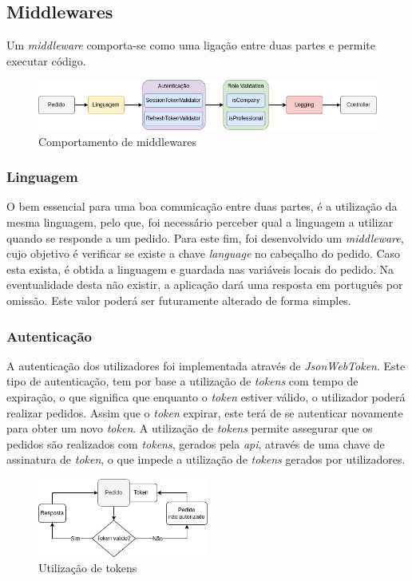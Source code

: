 \subsection{Middlewares} 
Um \textit{middleware} comporta-se como uma ligação entre duas partes e permite executar código.

\begin{figure}[htb]
 \centering
 \includegraphics[width=\textwidth]{images/implementacao/api/middlewares.png}
 \caption{Comportamento de middlewares}
 \label{middlewares_png}
\end{figure}

\subsubsection{Linguagem}
O bem essencial para uma boa comunicação entre duas partes, é a utilização da mesma linguagem, pelo que, foi necessário perceber qual a linguagem a utilizar quando se responde a um pedido. Para este fim, foi desenvolvido um \textit{middleware}, cujo objetivo é verificar se existe a chave \textit{language} no cabeçalho do pedido. Caso esta exista, é obtida a linguagem e guardada nas variáveis locais do pedido. Na eventualidade desta não existir, a aplicação dará uma resposta em português por omissão. Este valor poderá ser futuramente alterado de forma simples.

\newpage

\subsubsection{Autenticação}
A autenticação dos utilizadores foi implementada através de \textit{JsonWebToken}. Este tipo de autenticação, tem por base a utilização de \textit{tokens} com tempo de expiração, o que significa que enquanto o \textit{token} estiver válido, o utilizador poderá realizar pedidos. Assim que o \textit{token} expirar, este terá de se autenticar novamente para obter um novo \textit{token}.
A utilização de \textit{tokens} permite assegurar que os pedidos são realizados com \textit{tokens}, gerados pela \textit{api}, através de uma chave de assinatura de \textit{token}, o que impede a utilização de \textit{tokens} gerados por utilizadores.
\begin{figure}[htb]
 \centering
 \includegraphics[width=0.5\textwidth]{images/implementacao/api/jwt_session.png}
 \caption{Utilização de tokens}
 \label{fig:64}
\end{figure}

